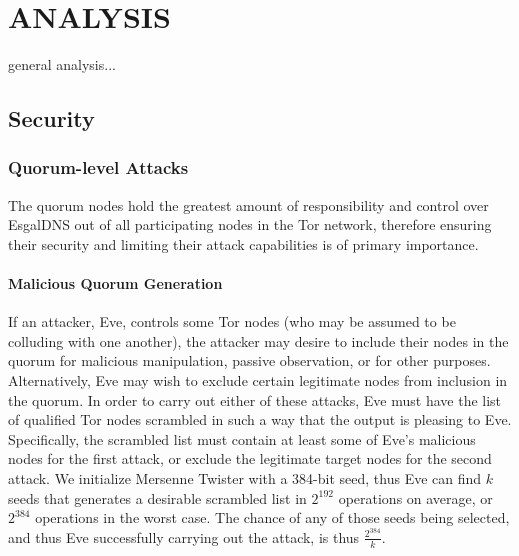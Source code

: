 

\chapter{\uppercase{Analysis}}

general analysis...

\section{Security}

\subsection{Quorum-level Attacks}

The quorum nodes hold the greatest amount of responsibility and control over EsgalDNS out of all participating nodes in the Tor network, therefore ensuring their security and limiting their attack capabilities is of primary importance.

\subsubsection{Malicious Quorum Generation}

If an attacker, Eve, controls some Tor nodes (who may be assumed to be colluding with one another), the attacker may desire to include their nodes in the quorum for malicious manipulation, passive observation, or for other purposes. Alternatively, Eve may wish to exclude certain legitimate nodes from inclusion in the quorum. In order to carry out either of these attacks, Eve must have the list of qualified Tor nodes scrambled in such a way that the output is pleasing to Eve. Specifically, the scrambled list must contain at least some of Eve's malicious nodes for the first attack, or exclude the legitimate target nodes for the second attack. We initialize Mersenne Twister with a 384-bit seed, thus Eve can find $ k $ seeds that generates a desirable scrambled list in $ 2^{192} $ operations on average, or $ 2^{384} $ operations in the worst case. The chance of any of those seeds being selected, and thus Eve successfully carrying out the attack, is thus $ \frac{2^{384}}{k} $.

